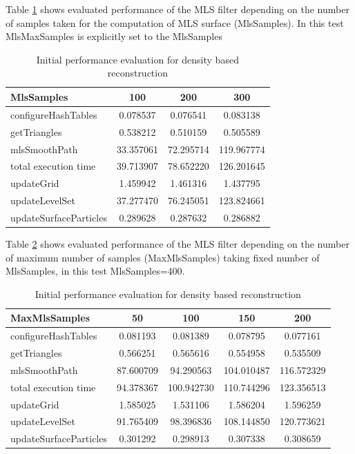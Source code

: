 Table \ref{tab:mls_ms_perf} shows evaluated performance of the MLS filter depending on the number of samples taken for the computation of MLS surface (MlsSamples). In this test MlsMaxSamples is explicitly set to the MlsSamples
\begin{table}[H]
	\begin{center}
		\scriptsize
		\begin{tabular}{|l|c|c|c|}
			\hline
			MlsSamples & 100 & 200 & 300 \\
			\hline
			configureHashTables		&	0.078537	&	0.076541	&	0.083138\\
			getTriangles			&	0.538212	&	0.510159	&	0.505589\\
			mlsSmoothPath			&	33.357061	&	72.295714	&	119.967774\\
			total execution time	&	39.713907	&	78.652220	&	126.201645\\
			updateGrid				&	1.459942	&	1.461316	&	1.437795\\
			updateLevelSet			&	37.277470	&	76.245051	&	123.824661\\
			updateSurfaceParticles	&	0.289628	&	0.287632	&	0.286882\\
			\hline
		\end{tabular}
	\end{center}
	\caption{Initial performance evaluation for density based reconstruction}
	\label{tab:mls_ms_perf}
\end{table}
Table \ref{tab:mls_mms_perf} shows evaluated performance of the MLS filter depending on the number of maximum number of samples  (MaxMlsSamples) taking fixed number of MlsSamples, in this test MlsSamples=400.
\begin{table}[H]
	\begin{center}
		\scriptsize
		\begin{tabular}{|l|c|c|c|c|}
			\hline
			MaxMlsSamples & 50 & 100 & 150 & 200 \\
			\hline
			configureHashTables     	& 0.081193	&	0.081389	& 0.078795		& 0.077161\\
			getTriangles    			& 0.566251	&	0.565616	& 0.554958		& 0.535509\\
			mlsSmoothPath   			& 87.600709	&	94.290563	& 104.010487	& 116.572329\\
			total execution time    	& 94.378367	&	100.942730	& 110.744296	& 123.356513\\
			updateGrid      			& 1.585025	&	1.531106	& 1.586204		& 1.596259\\
			updateLevelSet  			& 91.765409	&	98.396836	& 108.144850	& 120.773621\\
			updateSurfaceParticles  	& 0.301292	&	0.298913	& 0.307338		& 0.308659\\
			\hline
		\end{tabular}
	\end{center}
	\caption{Initial performance evaluation for density based reconstruction}
	\label{tab:mls_mms_perf}
\end{table}
